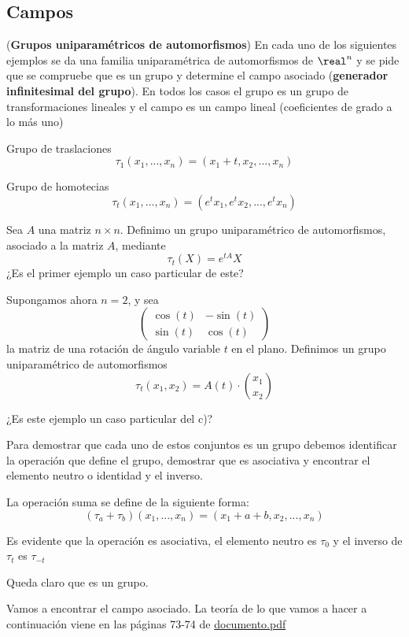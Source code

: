 \subsection{Campos}
\begin{problem}[1]
(\textbf{Grupos uniparamétricos de automorfismos}) En cada uno de los siguientes ejemplos se da una familia uniparamétrica de automorfismos de $\real^n$ y se pide que se compruebe que es un grupo y determine el campo asociado (\textbf{generador infinitesimal del grupo}). En todos los casos el grupo es un grupo de transformaciones lineales y el campo es un campo lineal (coeficientes de grado a lo más uno)

\ppart Grupo de traslaciones
\[τ_1(x_1,...,x_n)=(x_1+t,x_2,...,x_n)\]

\ppart Grupo de homotecias
\[τ_t(x_1,...,x_n)=(e^tx_1, e^tx_2,...,e^tx_n)\]

\ppart Sea $A$ una matriz $n\times n$. Definimo un grupo uniparamétrico de automorfismos, asociado a la matriz $A$, mediante
\[τ_t(X)=e^{tA}X\]
¿Es el primer ejemplo un caso particular de este?

\ppart
Supongamos ahora $n=2$, y sea
\[ \left( \begin{array}{cc}

\cos(t) & -\sin(t) \\
\sin(t) & \cos(t)

\end{array} \right)\]
la matriz de una rotación de ángulo variable $t$ en el plano. Definimos un grupo uniparamétrico de automorfismos
\[τ_t(x_1,x_2)=A(t)\cdot {x_1 \choose x_2}\]

¿Es este ejemplo un caso particular del c)?

\solution
\yoP

Para demostrar que cada uno de estos conjuntos es un grupo debemos identificar la operación que define el grupo, demostrar que es asociativa y encontrar el elemento neutro o identidad y el inverso.

\spart
La operación suma se define de la siguiente forma:
\[(τ_a+τ_b)(x_1,...,x_n)=(x_1+a+b,x_2,...,x_n)\]

Es evidente que la operación es asociativa, el elemento neutro es $τ_0$ y el inverso de $τ_t$ es $τ_{-t}$

Queda claro que es un grupo.

Vamos a encontrar el campo asociado. La teoría de lo que vamos a hacer a continuación viene en las páginas 73-74 de \href{http://matematicas.unex.es/~ricarfr/EcDiferenciales/LibroEDLat.pdf}{documento.pdf}


\end{problem}
